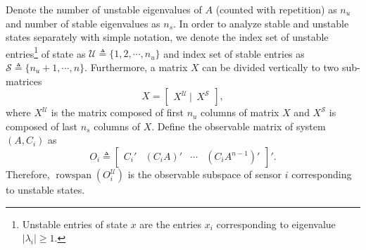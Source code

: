 \documentclass[12pt]{article}  %
\newcommand{\Uc}{{\mathcal{U}}}
\newcommand{\Sc}{{\mathcal{S}}}
\DeclareMathOperator{\rs}{{rowspan}}
\begin{document}
Denote the number of unstable eigenvalues of $A$ (counted with repetition) as $n_u$ and number of stable eigenvalues as $n_s$.
In order to analyze stable and unstable states separately with simple notation, we denote the index set of unstable entries\footnote{Unstable entries of state $x$ are the entries $x_i$ corresponding to eigenvalue $|\lambda_i| \geq1$.} of state as $\Uc\triangleq\{1,2,\cdots,n_u\}$ and index set of stable entries as $\Sc\triangleq\{n_u+1,\cdots,n\}$. 
Furthermore, a matrix $X$ can be divided vertically to two sub-matrices 
\begin{equation*}
X=\left[\begin{array}{c} X^\Uc \ | \ \ X^\Sc\end{array}\right] ,
\end{equation*}
where $X^\Uc$ is the matrix composed of first $n_u$ columns of matrix $X$ and $X^\Sc$ is composed of last $n_s$ columns of $X$. 
Define the observable matrix of system $(A,C_i)$ as 
\begin{equation}\label{eq:def_O}
O_{i} \triangleq\left[\begin{array}{c|c|c|c}
C_{i}{'} &
\left(C_{i} A\right){'} &
\cdots &
\left(C_{i} A^{n-1}\right){'}
\end{array}\right]{'}.
\end{equation}
Therefore, $\rs(O^\Uc_{i})$ is the observable subspace of sensor $i$ corresponding to unstable states.
\end{document}
